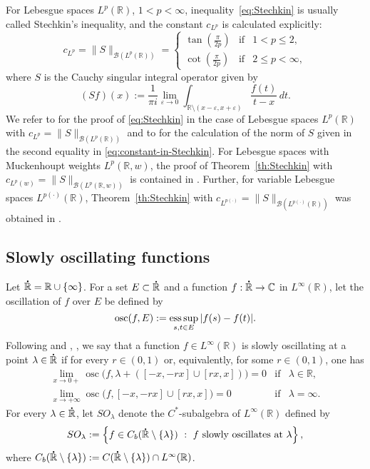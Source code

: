 \documentclass{birkjour}
\numberwithin{equation}{section}
\newcommand{\C}{\mathbb{C}}
\newcommand{\R}{\mathbb{R}}
\newcommand{\cB}{\mathcal{B}}
\newcommand{\eps}{\varepsilon}
\newcommand{\dR}{{\bf\dot{\R}}}
\begin{document}
For Lebesgue spaces $L^p(\R)$, $1<p<\infty$, inequality~\eqref{eq:Stechkin} is
usually called Stechkin's inequality, and the constant $c_{L^p}$ is
calculated explicitly:
\begin{equation}\label{eq:constant-in-Stechkin}
c_{L^p}=\|S\|_{\cB(L^p(\R))}=\left\{\begin{array}{ccc}
\tan\left(\frac{\pi}{2p}\right) &\mbox{if}& 1<p\le 2,
\\[3mm]
\cot\left(\frac{\pi}{2p}\right) &\mbox{if}& 2\le p<\infty,
\end{array}\right.
\end{equation}
where $S$ is the Cauchy singular integral operator given by
\[
(Sf)(x):=\frac{1}{\pi i}\lim_{\eps\to 0}\int_{\R\setminus(x-\eps,x+\eps)}
\frac{f(t)}{t-x}\,dt.
\]
We refer to \cite[Theorem~2.11]{D79} for the proof of \eqref{eq:Stechkin}
in the case of Lebesgue spaces $L^p(\R)$ with $c_{L^p}=\|S\|_{\cB(L^p(\R))}$
and to \cite[Chap. 13, Theorem 1.3]{GK92} for the calculation of the norm
of $S$ given in the second equality in \eqref{eq:constant-in-Stechkin}.
For Lebesgue spaces with Muckenhoupt weights $L^p(\R,w)$, the proof of
Theorem~\ref{th:Stechkin} with $c_{L^p(w)}=\|S\|_{\cB(L^p(\R,w))}$ is
contained in \cite[Theorem~17.1]{BKS02}. Further, for variable Lebesgue
spaces $L^{p(\cdot)}(\R)$, Theorem~\ref{th:Stechkin} with
$c_{L^{p(\cdot)}}=\|S\|_{\cB(L^{p(\cdot)}(\R))}$ was obtained in
\cite[Theorem~2]{K15d}.
\subsection{Slowly oscillating functions}\label{sec:SO-functions}
Let $\dR=\R\cup\{\infty\}$. For a set $E\subset\dR$ and a function
$f:\dR\to\C$ in $L^\infty(\R)$, let the oscillation of
$f$ over $E$ be defined by
\[
\operatorname{osc}(f,E)
:=
\operatornamewithlimits{ess\,sup}_{s,t\in E}|f(s)-f(t)|.
\]
Following \cite[Section~4]{BFK06} and
\cite[Section~2.1]{KILH12}, \cite[Section~2.1]{KILH13a},
we say that a function $f\in L^\infty(\R)$ is slowly
oscillating at a point $\lambda\in\dR$ if for every $r\in(0,1)$ or,
equivalently, for some $r\in(0,1)$, one has
\[
\begin{array}{lll}
\lim\limits_{x\to 0+}
\operatorname{osc}\big(f,\lambda+([-x,-rx]\cup[rx,x])\big)=0
&\mbox{if}& \lambda\in\R,
\\
\lim\limits_{x\to +\infty}
\operatorname{osc}\big(f,[-x,-rx]\cup[rx,x]\big)=0
&\mbox{if}& \lambda=\infty.
\end{array}
\]
For every $\lambda\in\dR$, let $SO_\lambda$ denote the $C^*$-subalgebra of
$L^\infty(\R)$ defined by
\[
SO_\lambda:=\left\{f\in C_b(\dR\setminus\{\lambda\})\ :\ f
\mbox{ slowly oscillates at }\lambda\right\},
\]
where
$C_b(\dR\setminus\{\lambda\}):=C(\dR\setminus\{\lambda\})\cap L^\infty(\R)$.
\end{document}
